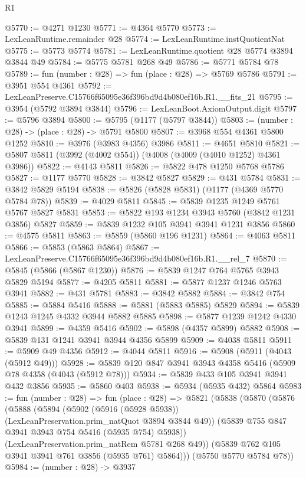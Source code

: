 \begin{lexlean}{R1}
\begin{coremodule}
@5770 := @4271 @1230
@5771 := @4364 @5770
@5773 := LexLeanRuntime.remainder @28
@5774 := LexLeanRuntime.instQuotientNat
@5775 := @5773 @5774
@5781 := LexLeanRuntime.quotient @28 @5774 @3894 @3844 @49
@5784 := @5775 @5781 @268 @49
@5786 := @5771 @5784 @78
@5789 := fun (number : @28) => fun (place : @28) => @5769 @5786
@5791 := @3951 @554 @4361
@5792 := LexLeanPreserve.C15766f65095e36f396bd9d4b080ef16b.R1.__fits_21
@5795 := @3954 (@5792 @3894 @3844)
@5796 := LexLeanBoot.AxiomOutput.digit
@5797 := @5796 @3894
@5800 := @5795 (@1177 (@5797 @3844))
@5803 := (number : @28) -> (place : @28) -> @5791 @5800
@5807 := @3968 @554 @4361 @5800 @1252
@5810 := @3976 (@3983 @4356) @3986
@5811 := @4651 @5810
@5821 := @5807 @5811 (@3992 (@4002 @554)) (@4008 (@4009 (@4010 @1252) @4361 @3986))
@5822 := @4143 @5811
@5826 := @5822 @478 @1250 @5768 @5786
@5827 := @1177 @5770
@5828 := @3842 @5827
@5829 := @431 @5784
@5831 := @3842 @5829 @5194
@5838 := @5826 (@5828 @5831) (@1177 (@4369 @5770 @5784 @78))
@5839 := @4029 @5811
@5845 := @5839 @1235 @1249 @5761 @5767 @5827 @5831
@5853 := @5822 @193 @1234 @3943 @5760 (@3842 @1231 @3856) @5827
@5859 := @5839 @1232 @105 @3941 @3941 @1231 @3856
@5860 := @4575 @5811
@5863 := @5859 (@5860 @196 @1231)
@5864 := @4063 @5811
@5866 := @5853 (@5863 @5864)
@5867 := LexLeanPreserve.C15766f65095e36f396bd9d4b080ef16b.R1.__rel_7
@5870 := @5845 (@5866 (@5867 @1230))
@5876 := @5839 @1247 @764 @5765 @3943 @5829 @5194
@5877 := @4205 @5811
@5881 := @5877 @1237 @1246 @5763 @3941
@5882 := @431 @5781
@5883 := @3842 @5882
@5884 := @3842 @754
@5885 := @5884 @5416
@5888 := @5881 (@5883 @5885) @5829
@5894 := @5839 @1243 @1245 @4332 @3944 @5882 @5885
@5898 := @5877 @1239 @1242 @4330 @3941
@5899 := @4359 @5416
@5902 := @5898 (@4357 @5899) @5882
@5908 := @5839 @131 @1241 @3941 @3944 @4356 @5899
@5909 := @4038 @5811
@5911 := @5909 @49 @4356
@5912 := @4044 @5811
@5916 := @5908 (@5911 (@4043 (@5912 @49)))
@5928 := @5839 @120 @847 @3941 @3943 @4358 @5416 (@5909 @78 @4358 (@4043 (@5912 @78)))
@5934 := @5839 @433 @105 @3941 @3941 @432 @3856
@5935 := @5860 @403
@5938 := @5934 (@5935 @432) @5864
@5983 := fun (number : @28) =>
  fun (place : @28) =>
  @5821
    (@5838
      (@5870
        (@5876
          (@5888
            (@5894
              (@5902 (@5916 (@5928 @5938)) (LexLeanPreservation.prim_natQuot @3894 @3844 @49))
              (@5839 @755 @847 @3941 @3943 @754 @5416 (@5935 @754) @5938))
            (LexLeanPreservation.prim_natRem @5781 @268 @49))
          (@5839 @762 @105 @3941 @3941 @761 @3856 (@5935 @761) @5864)))
      (@5750 @5770 @5784 @78))
@5984 := (number : @28) -> @3937

\end{coremodule}
\end{lexlean}
